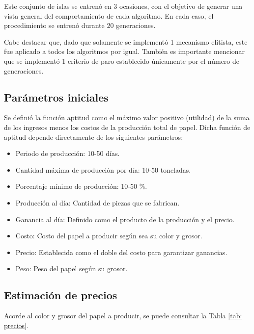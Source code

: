 Este conjunto de islas se entrenó en 3 ocasiones, con el objetivo de generar una vista general del comportamiento de cada algoritmo. En cada caso, el procedimiento se entrenó durante 20 generaciones.

Cabe destacar que, dado que solamente se implementó 1 mecanismo elitista, este fue aplicado a todos los algoritmos por igual. También es importante mencionar que se implementó 1 criterio de paro establecido únicamente por el número de generaciones.

\subsection{Parámetros iniciales}
Se definió la función aptitud como el máximo valor positivo (utilidad) de la suma de los ingresos menos los costos de la producción total de papel. Dicha función de aptitud depende directamente de los siguientes parámetros:

\begin{itemize}
	\item Periodo de producción: 10-50 días.
	\item Cantidad máxima de producción por día: 10-50 toneladas.
	\item Porcentaje mínimo de producción: 10-50 \%.
	\item Producción al día: Cantidad de piezas que se fabrican.
	\item Ganancia al día: Definido como el producto de la producción y el precio.
	\item Costo: Costo del papel a producir según sea su color y grosor.
	\item Precio: Establecida como el doble del costo para garantizar ganancias.
	\item Peso: Peso del papel según su grosor.
\end{itemize}

\subsection{Estimación de precios}
Acorde al color y grosor del papel a producir, se puede consultar la Tabla \ref{tab: precios}.

